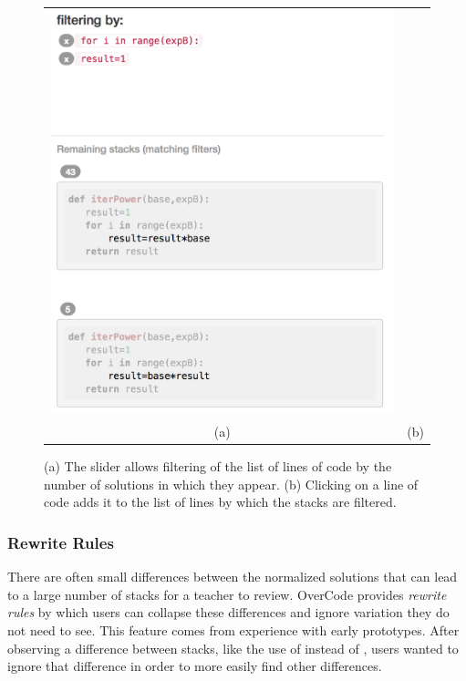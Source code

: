 \begin{figure}[htpb]
\begin{tabular}{c | c}
\begin{minipage}{.52\linewidth}
\includegraphics[scale=0.40]{Body/figures/overcode/lineFilter.png}
\end{minipage}
\\
(a) & (b)
\end{tabular}
\caption{(a) The slider allows filtering of the list of lines of code by the number of solutions in which they appear. (b) Clicking on a line of code adds it to the list of lines by which the stacks are filtered.}
\label{linefilter}
\end{figure}

\subsubsection{Rewrite Rules} There are often small differences between the normalized solutions that can lead to a large number of stacks for a teacher to review. OverCode provides \emph{rewrite rules} by which users can collapse these differences and ignore variation they do not need to see. This feature comes from experience with early prototypes. After observing a difference between stacks, like the use of  instead of , users wanted to ignore that difference in order to more easily find other differences.

